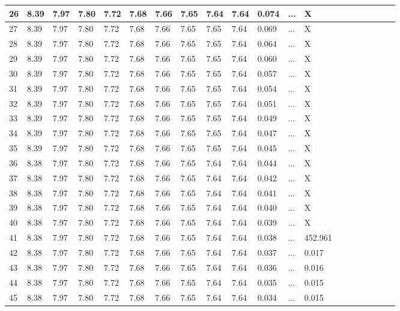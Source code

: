 \documentclass{article}
\begin{document}
\begin{table}[H]
\begin{adjustwidth}{-.7in}{-.7in}
\begin{tabular}{|l|l|l|l|l|l|l|l|l|l|l|l|l|l|l|l|l|l|l|l|}
26 & 8.39 & 7.97 & 7.80 & 7.72 & 7.68 & 7.66 & 7.65 & 7.64 & 7.64 & 0.074 & ... & X \\ \hline
27 & 8.39 & 7.97 & 7.80 & 7.72 & 7.68 & 7.66 & 7.65 & 7.65 & 7.64 & 0.069 & ... & X \\ \hline
28 & 8.39 & 7.97 & 7.80 & 7.72 & 7.68 & 7.66 & 7.65 & 7.65 & 7.64 & 0.064 & ... & X \\ \hline
29 & 8.39 & 7.97 & 7.80 & 7.72 & 7.68 & 7.66 & 7.65 & 7.65 & 7.64 & 0.060 & ... & X \\ \hline
30 & 8.39 & 7.97 & 7.80 & 7.72 & 7.68 & 7.66 & 7.65 & 7.65 & 7.64 & 0.057 & ... & X \\ \hline
31 & 8.39 & 7.97 & 7.80 & 7.72 & 7.68 & 7.66 & 7.65 & 7.65 & 7.64 & 0.054 & ... & X \\ \hline
32 & 8.39 & 7.97 & 7.80 & 7.72 & 7.68 & 7.66 & 7.65 & 7.65 & 7.64 & 0.051 & ... & X \\ \hline
33 & 8.39 & 7.97 & 7.80 & 7.72 & 7.68 & 7.66 & 7.65 & 7.65 & 7.64 & 0.049 & ... & X \\ \hline
34 & 8.39 & 7.97 & 7.80 & 7.72 & 7.68 & 7.66 & 7.65 & 7.65 & 7.64 & 0.047 & ... & X \\ \hline
35 & 8.39 & 7.97 & 7.80 & 7.72 & 7.68 & 7.66 & 7.65 & 7.65 & 7.64 & 0.045 & ... & X \\ \hline
36 & 8.38 & 7.97 & 7.80 & 7.72 & 7.68 & 7.66 & 7.65 & 7.64 & 7.64 & 0.044 & ... & X \\ \hline
37 & 8.38 & 7.97 & 7.80 & 7.72 & 7.68 & 7.66 & 7.65 & 7.64 & 7.64 & 0.042 & ... & X \\ \hline
38 & 8.38 & 7.97 & 7.80 & 7.72 & 7.68 & 7.66 & 7.65 & 7.64 & 7.64 & 0.041 & ... & X \\ \hline
39 & 8.38 & 7.97 & 7.80 & 7.72 & 7.68 & 7.66 & 7.65 & 7.64 & 7.64 & 0.040 & ... & X \\ \hline
40 & 8.38 & 7.97 & 7.80 & 7.72 & 7.68 & 7.66 & 7.65 & 7.64 & 7.64 & 0.039 & ... & X \\ \hline
41 & 8.38 & 7.97 & 7.80 & 7.72 & 7.68 & 7.66 & 7.65 & 7.64 & 7.64 & 0.038 & ... & 452.961 \\ \hline
42 & 8.38 & 7.97 & 7.80 & 7.72 & 7.68 & 7.66 & 7.65 & 7.64 & 7.64 & 0.037 & ... & 0.017 \\ \hline
43 & 8.38 & 7.97 & 7.80 & 7.72 & 7.68 & 7.66 & 7.65 & 7.64 & 7.64 & 0.036 & ... & 0.016 \\ \hline
44 & 8.38 & 7.97 & 7.80 & 7.72 & 7.68 & 7.66 & 7.65 & 7.64 & 7.64 & 0.035 & ... & 0.015 \\ \hline
45 & 8.38 & 7.97 & 7.80 & 7.72 & 7.68 & 7.66 & 7.65 & 7.64 & 7.64 & 0.034 & ... & 0.015 \\ \hline

\end{tabular}
\end{adjustwidth}
\end{table}
\end{document}
